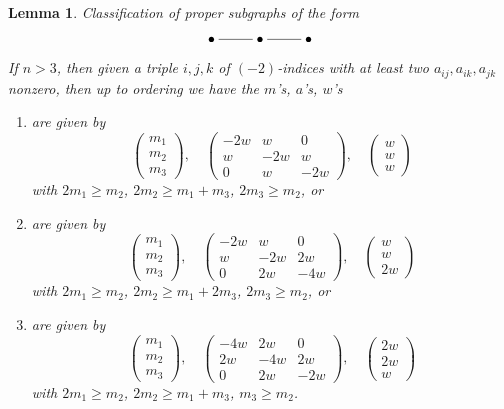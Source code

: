 \documentclass{stacks-project}
\theoremstyle{plain}
\newtheorem{lemma}[subsection]{Lemma}
\theoremstyle{definition}
\theoremstyle{remark}
\numberwithin{equation}{subsection}
\begin{document}
\begin{lemma}
\label{lemma-three-by-three}
Classification of proper subgraphs of the form
$$
\xymatrix{
\bullet \ar@{-}[r] &
\bullet \ar@{-}[r] &
\bullet
}
$$
If $n > 3$, then given a triple $i, j, k$ of $(-2)$-indices
with at least two $a_{ij}, a_{ik}, a_{jk}$ nonzero, then up
to ordering we have the $m$'s, $a$'s, $w$'s
\begin{enumerate}
\item
\label{item-A3}
are given by
$$
\left(
\begin{matrix}
m_1 \\
m_2 \\
m_3
\end{matrix}
\right),
\quad
\left(
\begin{matrix}
-2w & w & 0 \\
w & -2w & w \\
0 & w & -2w
\end{matrix}
\right),
\quad
\left(
\begin{matrix}
w \\
w \\
w
\end{matrix}
\right)
$$
with $2m_1 \geq m_2$, $2m_2 \geq m_1 + m_3$, $2m_3 \geq m_2$, or
\item
\label{item-C3}
are given by
$$
\left(
\begin{matrix}
m_1 \\
m_2 \\
m_3
\end{matrix}
\right),
\quad
\left(
\begin{matrix}
-2w & w & 0 \\
w & -2w & 2w \\
0 & 2w & -4w
\end{matrix}
\right),
\quad
\left(
\begin{matrix}
w \\
w \\
2w
\end{matrix}
\right)
$$
with $2m_1 \geq m_2$, $2m_2 \geq m_1 + 2m_3$, $2m_3 \geq m_2$, or
\item
\label{item-B3}
are given by
$$
\left(
\begin{matrix}
m_1 \\
m_2 \\
m_3
\end{matrix}
\right),
\quad
\left(
\begin{matrix}
-4w & 2w & 0 \\
2w & -4w & 2w \\
0 & 2w & -2w
\end{matrix}
\right),
\quad
\left(
\begin{matrix}
2w \\
2w \\
w
\end{matrix}
\right)
$$
with $2m_1 \geq m_2$, $2m_2 \geq m_1 + m_3$, $m_3 \geq m_2$.
\end{enumerate}
\end{lemma}
\end{document}
